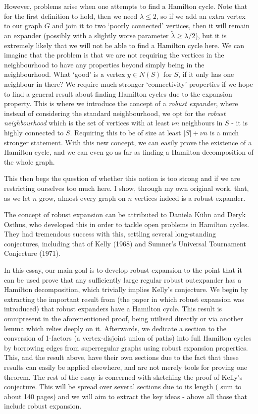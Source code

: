 \documentclass[10pt,letterpaper, reqno]{amsart}
\theoremstyle{definition}
\numberwithin{equation}{section}
\begin{document}
However, problems arise when one attempts to find a Hamilton cycle. Note that for the first definition to hold, then we need $\lambda \leq 2$, so if we add an extra vertex to our graph $G$ and join it to two `poorly connected' vertices, then it will remain an expander (possibly with a slightly worse parameter $\tilde{\lambda} \geq \lambda /2$), but it is extremely likely that we will not be able to find a Hamilton cycle here. We can imagine that the problem is that we are not requiring the vertices in the neighbourhood to have any properties beyond simply being in the neighbourhood. What `good' is a vertex $y \in N(S)$ for $S$, if it only has one neighbour in there? We require much stronger `connectivity' properties if we hope to find a general result about finding Hamilton cycles due to the expansion property. This is where we introduce the concept of a \textit{robust expander}, where instead of considering the standard neighbourhood, we opt for the \textit{robust neighbourhood} which is the set of vertices with at least $\nu n$ neighbours in $S$ - it is highly connected to $S$. Requiring this to be of size at least $|S| + \nu n$ is a much stronger statement. With this new concept, we can easily prove the existence of a Hamilton cycle, and we can even go as far as finding a Hamilton decomposition of the whole graph. 

This then begs the question of whether this notion is too strong and if we are restricting ourselves too much here. I show, through my own original work, that, as we let $n$ grow, almost every graph on $n$ vertices indeed is a robust expander.

The concept of robust expansion can be attributed to Daniela K\"{u}hn and Deryk Osthus, who developed this in order to tackle open problems in Hamilton cycles. They had tremendous success with this, settling several long-standing conjectures, including that of Kelly (1968) and Sumner's Universal Tournament Conjecture (1971). 

In this essay, our main goal is to develop robust expansion to the point that it can be used prove that any sufficiently large regular robust outexpander has a Hamilton decomposition, which trivially implies Kelly's conjecture. We begin by extracting the important result from \cite{DegreeSequencesInDigraphs} (the paper in which robust expansion was introduced) that robust expanders have a Hamilton cycle. This result is omnipresent in the aforementioned proof, being utilised directly or via another lemma which relies deeply on it. Afterwards, we dedicate a section to the conversion of 1-factors (a vertex-disjoint union of paths) into full Hamilton cycles by borrowing edges from superregular graphs using robust expansion properties. This, and the result above, have their own sections due to the fact that these results can easily be applied elsewhere, and are not merely tools for proving one theorem. The rest of the essay is concerned with sketching the proof of Kelly's conjecture. This will be spread over several sections due to its length (\cite{HamiltonDecomp,ApproxHamiltonDecomp} sum to about 140 pages) and we will aim to extract the key ideas - above all those that include robust expansion.  
\end{document}
